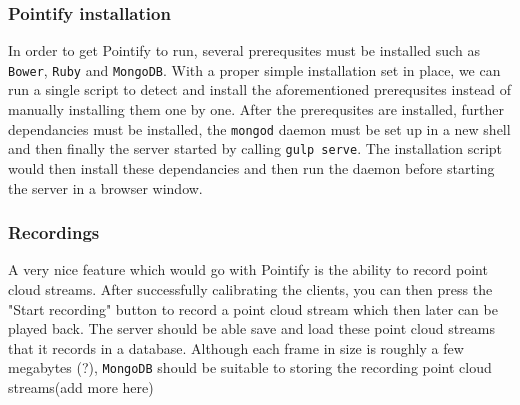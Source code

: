 \documentclass{article}
\begin{document}
\subsubsection{Pointify installation}
In order to get Pointify to run, several prerequsites must be installed such as \texttt{Bower}, \texttt{Ruby} and \texttt{MongoDB}. With a proper simple installation set in place, we can run a single script to detect and install the aforementioned prerequsites instead of manually installing them one by one. After the prerequsites are installed, further dependancies must be installed, the \texttt{mongod} daemon must be set up in a new shell and then finally the server started by calling \texttt{gulp serve}. The installation script would then install these dependancies and then run the daemon before starting the server in a browser window.
\subsubsection{Recordings}
A very nice feature which would go with Pointify is the ability to record point cloud streams. After successfully calibrating the clients, you can then press the "Start recording" button to record a point cloud stream which then later can be played back. The server should be able save and load these point cloud streams that it records in a database. Although each frame in size is roughly a few megabytes (?), \texttt{MongoDB} should be suitable to storing the recording point cloud streams(add more here)

\end{document}
